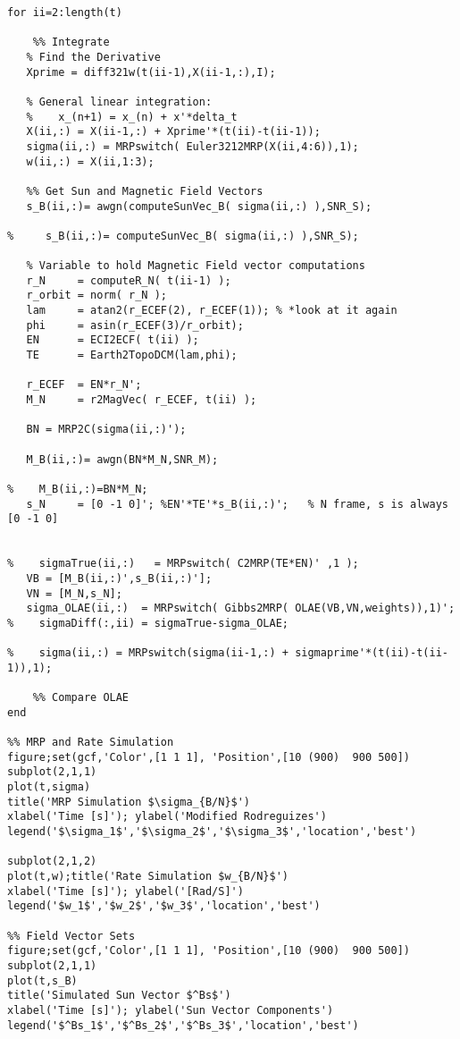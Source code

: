 \documentclass[11pt]{aiaa-tc}%
\begin{document}
\begin{lstlisting}
for ii=2:length(t)
    
    %% Integrate
   % Find the Derivative
   Xprime = diff321w(t(ii-1),X(ii-1,:),I);
   
   % General linear integration:
   %    x_(n+1) = x_(n) + x'*delta_t
   X(ii,:) = X(ii-1,:) + Xprime'*(t(ii)-t(ii-1));
   sigma(ii,:) = MRPswitch( Euler3212MRP(X(ii,4:6)),1);
   w(ii,:) = X(ii,1:3);
   
   %% Get Sun and Magnetic Field Vectors
   s_B(ii,:)= awgn(computeSunVec_B( sigma(ii,:) ),SNR_S);

%     s_B(ii,:)= computeSunVec_B( sigma(ii,:) ),SNR_S);

   % Variable to hold Magnetic Field vector computations
   r_N     = computeR_N( t(ii-1) );
   r_orbit = norm( r_N );
   lam     = atan2(r_ECEF(2), r_ECEF(1)); % *look at it again
   phi     = asin(r_ECEF(3)/r_orbit);
   EN      = ECI2ECF( t(ii) );
   TE      = Earth2TopoDCM(lam,phi);
   
   r_ECEF  = EN*r_N';
   M_N     = r2MagVec( r_ECEF, t(ii) );
   
   BN = MRP2C(sigma(ii,:)');

   M_B(ii,:)= awgn(BN*M_N,SNR_M);

%    M_B(ii,:)=BN*M_N;
   s_N     = [0 -1 0]'; %EN'*TE'*s_B(ii,:)';   % N frame, s is always [0 -1 0]
   
   
%    sigmaTrue(ii,:)   = MRPswitch( C2MRP(TE*EN)' ,1 );
   VB = [M_B(ii,:)',s_B(ii,:)'];
   VN = [M_N,s_N];
   sigma_OLAE(ii,:)  = MRPswitch( Gibbs2MRP( OLAE(VB,VN,weights)),1)';
%    sigmaDiff(:,ii) = sigmaTrue-sigma_OLAE;
   
%    sigma(ii,:) = MRPswitch(sigma(ii-1,:) + sigmaprime'*(t(ii)-t(ii-1)),1);

    %% Compare OLAE
end

%% MRP and Rate Simulation
figure;set(gcf,'Color',[1 1 1], 'Position',[10 (900)  900 500])
subplot(2,1,1)
plot(t,sigma)
title('MRP Simulation $\sigma_{B/N}$')
xlabel('Time [s]'); ylabel('Modified Rodreguizes')
legend('$\sigma_1$','$\sigma_2$','$\sigma_3$','location','best')

subplot(2,1,2)
plot(t,w);title('Rate Simulation $w_{B/N}$')
xlabel('Time [s]'); ylabel('[Rad/S]')
legend('$w_1$','$w_2$','$w_3$','location','best')

%% Field Vector Sets
figure;set(gcf,'Color',[1 1 1], 'Position',[10 (900)  900 500])
subplot(2,1,1)
plot(t,s_B)
title('Simulated Sun Vector $^Bs$')
xlabel('Time [s]'); ylabel('Sun Vector Components')
legend('$^Bs_1$','$^Bs_2$','$^Bs_3$','location','best')


\end{lstlisting}
\end{document}
